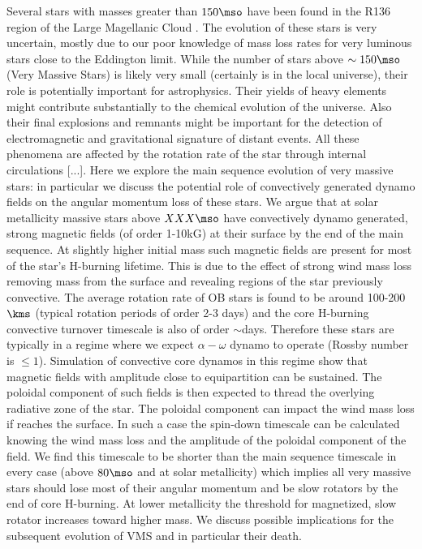 Several stars with masses greater than $150\mso$ have been found in the R136 region of the Large Magellanic Cloud  \cite{sof_Parker_Goodwin_Kassim_2010}. The evolution of these stars is very uncertain, mostly due to our poor knowledge of mass loss rates for very luminous stars close to the Eddington limit. While the number of stars above $\sim 150\mso$ (Very Massive Stars) is likely very small (certainly is in the local universe), their role is potentially important for astrophysics. Their yields of heavy elements might contribute substantially to the chemical evolution of the universe. Also their final explosions and remnants might be important for the detection of electromagnetic and gravitational signature of distant events. All these phenomena are affected by the rotation rate of the star through internal circulations [...]. Here we explore the main sequence evolution of very massive stars: in particular we discuss the potential role of convectively generated dynamo fields on the angular momentum loss of these stars. We argue that at solar metallicity massive stars above $XXX\mso$ have convectively dynamo generated, strong magnetic fields (of order 1-10kG) at their surface by the end of the main sequence. At slightly higher initial mass such magnetic fields are present for most of the star's H-burning lifetime. This is due to the effect of strong wind mass loss removing mass from the surface and revealing regions of the star previously convective. The average rotation rate of OB stars is found to be around 100-200$\kms$ (typical rotation periods of order 2-3 days) and the core H-burning convective turnover timescale is also of order $\sim$days. Therefore these stars are typically in a regime where we expect $\alpha-\omega$ dynamo to operate (Rossby number is $\le 1$). Simulation of convective core dynamos in this regime show that magnetic fields with amplitude close to equipartition can be sustained. The poloidal component of such fields is then expected to thread the overlying radiative zone of the star. The poloidal component can impact the wind mass loss if reaches the surface.  In such a case the spin-down timescale can be calculated knowing the wind mass loss and the amplitude of the poloidal component of the field. We find this timescale to be shorter than the main sequence timescale in every case (above $80\mso$ and at solar metallicity) which implies all very massive stars should lose most of their angular momentum and be slow rotators by the end of core H-burning. At lower metallicity the threshold for magnetized, slow rotator increases toward higher mass. We discuss possible implications for the subsequent evolution of VMS and in particular their death. 
